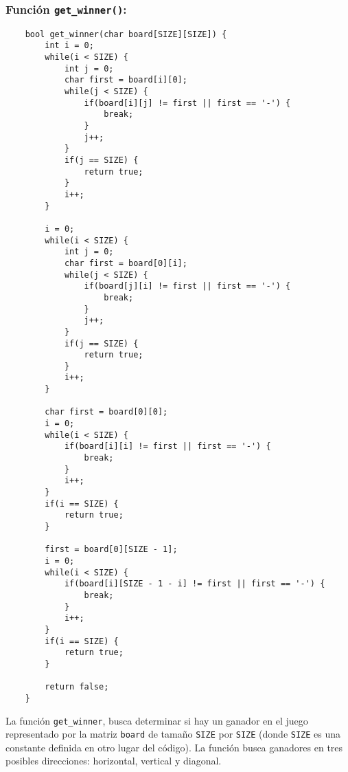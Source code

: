 \subsubsection{Función \texttt{get\_winner()}:}

\begin{verbatim}
    bool get_winner(char board[SIZE][SIZE]) {
        int i = 0;
        while(i < SIZE) {
            int j = 0;
            char first = board[i][0];
            while(j < SIZE) {
                if(board[i][j] != first || first == '-') {
                    break;
                }
                j++;
            }
            if(j == SIZE) {
                return true;
            }
            i++;
        }
    
        i = 0;
        while(i < SIZE) {
            int j = 0;
            char first = board[0][i];
            while(j < SIZE) {
                if(board[j][i] != first || first == '-') {
                    break;
                }
                j++;
            }
            if(j == SIZE) {
                return true;
            }
            i++;
        }
    
        char first = board[0][0];
        i = 0;
        while(i < SIZE) {
            if(board[i][i] != first || first == '-') {
                break;
            }
            i++;
        }
        if(i == SIZE) {
            return true;
        }
    
        first = board[0][SIZE - 1];
        i = 0;
        while(i < SIZE) {
            if(board[i][SIZE - 1 - i] != first || first == '-') {
                break;
            }
            i++;
        }
        if(i == SIZE) {
            return true;
        }
    
        return false;
    }
\end{verbatim}

La función \texttt{get\_winner}, busca determinar si hay un ganador en el juego representado por la matriz \texttt{board} de tamaño \texttt{SIZE} por \texttt{SIZE} (donde \texttt{SIZE} es una constante definida en otro lugar del código). La función busca ganadores en tres posibles direcciones: horizontal, vertical y diagonal.

